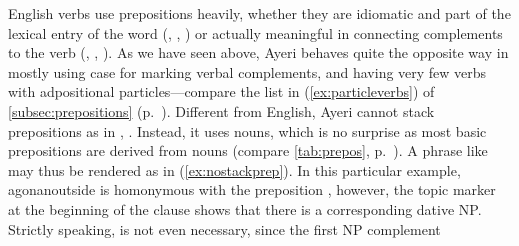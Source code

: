 English verbs use prepositions heavily, whether they are idiomatic and part of
the lexical entry of the word (, , ) or
actually meaningful in connecting complements to the verb (, 
, ). As we have seen above, Ayeri behaves quite the
opposite way in mostly using case for marking verbal complements, and having
very few verbs with adpositional particles---compare the list in
(\ref{ex:particleverbs}) of \autoref{subsec:prepositions}
(p.~\pageref{ex:particleverbs}). Different from English, Ayeri cannot stack
prepositions as in , . Instead, it uses nouns, which is no surprise as most basic
prepositions are derived from nouns (compare \autoref{tab:prepos},
p.~\pageref{tab:prepos}). A phrase like  may thus be
rendered as in (\ref{ex:nostackprep}). In this particular example,
 {agonan}{outside} is homonymous with the preposition
, however, the topic marker at the beginning
of the clause shows that there is a corresponding dative NP. Strictly speaking,
 is not even necessary, since the first NP complement
